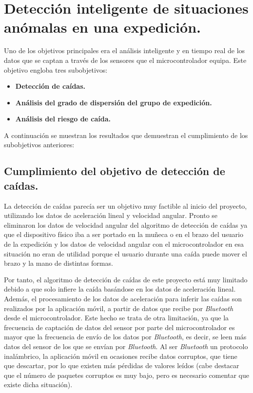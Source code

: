 \section{Detección inteligente de situaciones anómalas en una expedición.}

Uno de los objetivos principales era el análisis inteligente y en tiempo real de los datos que se captan a través de los sensores que el microcontrolador equipa. Este objetivo engloba tres subobjetivos:

\begin{itemize}
\item \textbf{Detección de caídas.}
\item \textbf{Análisis del grado de dispersión del grupo de expedición.}
\item \textbf{Análisis del riesgo de caída.}
\end{itemize}

A continuación se muestran los resultados que demuestran el cumplimiento de los subobjetivos anteriores:

\subsection{Cumplimiento del objetivo de detección de caídas.}

La detección de caídas parecía ser un objetivo muy factible al inicio del proyecto, utilizando los datos de aceleración lineal y velocidad angular. Pronto se eliminaron los datos de velocidad angular del algoritmo de detección de caídas ya que el dispositivo físico iba a ser portado en la muñeca o en el brazo del usuario de la expedición y los datos de velocidad angular con el microcontrolador en esa situación no eran de utilidad porque el usuario durante una caída puede mover el brazo y la mano de distintas formas.

Por tanto, el algoritmo de detección de caídas de este proyecto está muy limitado debido a que solo infiere la caída basándose en los datos de aceleración lineal. Además, el procesamiento de los datos de aceleración para inferir las caídas son realizados por la aplicación móvil, a partir de datos que recibe por \textit{Bluetooth} desde el microcontrolador. Este hecho se trata de otra limitación, ya que la frecuencia de captación de datos del sensor por parte del microcontrolador es mayor que la frecuencia de envío de los datos por \textit{Bluetooth}, es decir, se leen más datos del sensor de los que se envían por \textit{Bluetooth}. Al ser \textit{Bluetooth} un protocolo inalámbrico, la aplicación móvil en ocasiones recibe datos corruptos, que tiene que descartar, por lo que existen más pérdidas de valores leídos (cabe destacar que el número de paquetes corruptos es muy bajo, pero es necesario comentar que existe dicha situación).

